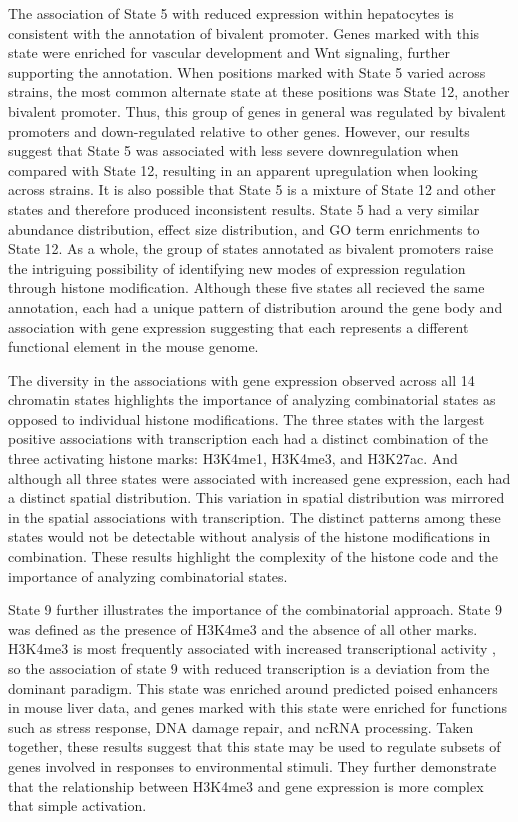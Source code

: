 \documentclass[
  11pt,
]{article}
\begin{document}
The association of State 5 with reduced expression within hepatocytes is
consistent with the annotation of bivalent promoter. Genes marked with
this state were enriched for vascular development and Wnt signaling,
further supporting the annotation. When positions marked with State 5
varied across strains, the most common alternate state at these
positions was State 12, another bivalent promoter. Thus, this group of
genes in general was regulated by bivalent promoters and down-regulated
relative to other genes. However, our results suggest that State 5 was
associated with less severe downregulation when compared with State 12,
resulting in an apparent upregulation when looking across strains. It is
also possible that State 5 is a mixture of State 12 and other states and
therefore produced inconsistent results. State 5 had a very similar
abundance distribution, effect size distribution, and GO term
enrichments to State 12. As a whole, the group of states annotated as
bivalent promoters raise the intriguing possibility of identifying new
modes of expression regulation through histone modification. Although
these five states all recieved the same annotation, each had a unique
pattern of distribution around the gene body and association with gene
expression suggesting that each represents a different functional
element in the mouse genome.

The diversity in the associations with gene expression observed across
all 14 chromatin states highlights the importance of analyzing
combinatorial states as opposed to individual histone modifications. The
three states with the largest positive associations with transcription
each had a distinct combination of the three activating histone marks:
H3K4me1, H3K4me3, and H3K27ac. And although all three states were
associated with increased gene expression, each had a distinct spatial
distribution. This variation in spatial distribution was mirrored in the
spatial associations with transcription. The distinct patterns among
these states would not be detectable without analysis of the histone
modifications in combination. These results highlight the complexity of
the histone code and the importance of analyzing combinatorial states.

State 9 further illustrates the importance of the combinatorial
approach. State 9 was defined as the presence of H3K4me3 and the absence
of all other marks. H3K4me3 is most frequently associated with increased
transcriptional activity
\citep{pmid15680324, pmid14661024, pmid12353038, pmid16728976}, so the
association of state 9 with reduced transcription is a deviation from
the dominant paradigm. This state was enriched around predicted poised
enhancers in mouse liver data, and genes marked with this state were
enriched for functions such as stress response, DNA damage repair, and
ncRNA processing. Taken together, these results suggest that this state
may be used to regulate subsets of genes involved in responses to
environmental stimuli. They further demonstrate that the relationship
between H3K4me3 and gene expression is more complex that simple
activation.
\end{document}
